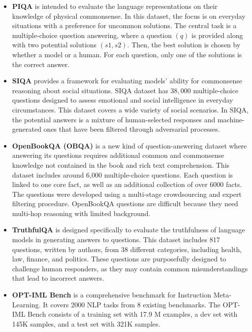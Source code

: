 \documentclass[conference]{IEEEtran}
\begin{document}
\begin{itemize}
    \item \textbf{PIQA} \cite{DBLP:journals/corr/abs-1911-11641} is intended to evaluate the language representations on their knowledge of physical commonsense. In this dataset,  the focus is on everyday situations with a preference for uncommon solutions.  The central task is a multiple-choice question answering, where a question $(q)$ is provided along with two potential solutions $(s1, s2)$. Then,  the best solution is chosen by whether a model or a human. For each question, only one of the solutions is the correct answer.

    \item \textbf{SIQA} \cite{DBLP:journals/corr/abs-1904-09728} provides a framework for evaluating models' ability for commonsense reasoning about social situations. SIQA dataset has $38,000$ multiple-choice questions designed to assess emotional and social intelligence in everyday circumstances. This dataset covers a wide variety of social scenarios. In SIQA, the potential answers is a mixture of human-selected responses and machine-generated ones that have been filtered through adversarial processes.

    \item \textbf{OpenBookQA (OBQA)} \cite{DBLP:journals/corr/abs-1809-02789} is a new kind of question-answering dataset where answering its questions requires additional common and commonsense knowledge not contained in the book and rich text comprehension. This dataset includes around 6,000 multiple-choice questions. Each question is linked to one core fact, as well as an additional collection of over $6000$ facts. The questions were developed using a multi-stage crowdsourcing and expert filtering procedure. OpenBookQA questions are difficult because they need multi-hop reasoning with limited background.

    \item  \textbf{TruthfulQA} \cite{lin2021truthfulqa} is designed specifically to evaluate the truthfulness of language models in generating answers to questions. This dataset includes 817 questions, written by authors, from $38$ different categories, including health, law, finance, and politics. These questions are purposefully designed to challenge human responders, as they may contain common misunderstandings that lead to incorrect answers.

    \item  \textbf{OPT-IML Bench} \cite{iyer2022opt} is a comprehensive benchmark for Instruction Meta-Learning.  It covers  2000  NLP tasks from 8 existing benchmarks. The OPT-IML Bench consists of a training set with 17.9 M examples, a dev set with 145K samples, and a test set with 321K samples.
\end{itemize}
\end{document}
